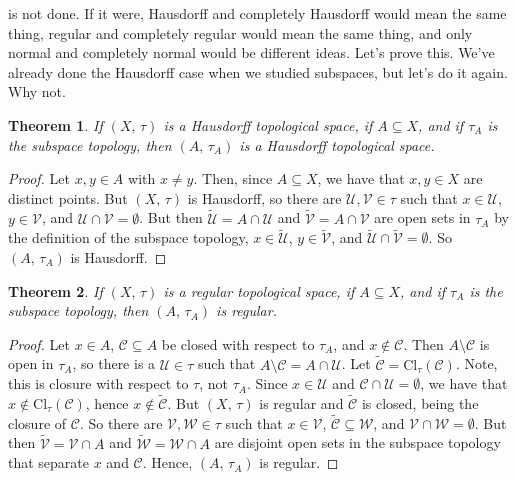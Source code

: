 \documentclass{article}
\theoremstyle{plain}
\newtheorem{theorem}{Theorem}[section]
\theoremstyle{normal}
\begin{document}
        is not done. If it were, Hausdorff and completely Hausdorff would mean
        the same thing, regular and completely regular would mean the same
        thing, and only normal and completely normal would be different ideas.
        Let's prove this. We've already done the Hausdorff case when we studied
        subspaces, but let's do it again. Why not.
        \begin{theorem}
            If $(X,\,\tau)$ is a Hausdorff topological space, if
            $A\subseteq{X}$, and if $\tau_{A}$ is the subspace topology, then
            $(A,\,\tau_{A})$ is a Hausdorff topological space.
        \end{theorem}
        \begin{proof}
            Let $x,y\in{A}$ with $x\ne{y}$. Then, since $A\subseteq{X}$, we
            have that $x,y\in{X}$ are distinct points. But $(X,\,\tau)$ is
            Hausdorff, so there are $\mathcal{U},\mathcal{V}\in\tau$ such that
            $x\in\mathcal{U}$, $y\in\mathcal{V}$, and
            $\mathcal{U}\cap\mathcal{V}=\emptyset$. But then
            $\tilde{\mathcal{U}}=A\cap\mathcal{U}$ and
            $\tilde{\mathcal{V}}=A\cap\mathcal{V}$ are open sets in $\tau_{A}$
            by the definition of the subspace topology,
            $x\in\tilde{\mathcal{U}}$, $y\in\tilde{\mathcal{V}}$, and
            $\tilde{\mathcal{U}}\cap\tilde{\mathcal{V}}=\emptyset$. So
            $(A,\,\tau_{A})$ is Hausdorff.
        \end{proof}
        \begin{theorem}
            If $(X,\,\tau)$ is a regular topological space, if
            $A\subseteq{X}$, and if $\tau_{A}$ is the subspace topology,
            then $(A,\,\tau_{A})$ is regular.
        \end{theorem}
        \begin{proof}
            Let $x\in{A}$, $\mathcal{C}\subseteq{A}$ be closed with respect
            to $\tau_{A}$, and $x\notin\mathcal{C}$. Then
            $A\setminus\mathcal{C}$ is open in $\tau_{A}$, so there is a
            $\mathcal{U}\in\tau$ such that
            $A\setminus\mathcal{C}=A\cap\mathcal{U}$. Let
            $\tilde{\mathcal{C}}=\textrm{Cl}_{\tau}(\mathcal{C})$. Note, this
            is closure with respect to $\tau$, not $\tau_{A}$. Since
            $x\in\mathcal{U}$ and $\mathcal{C}\cap\mathcal{U}=\emptyset$, we
            have that $x\not\in\textrm{Cl}_{\tau}(\mathcal{C})$, hence
            $x\notin\tilde{\mathcal{C}}$. But $(X,\,\tau)$ is regular and
            $\tilde{\mathcal{C}}$ is closed, being the closure of $\mathcal{C}$.
            So there are $\mathcal{V},\mathcal{W}\in\tau$ such that
            $x\in\mathcal{V}$, $\tilde{\mathcal{C}}\subseteq\mathcal{W}$, and
            $\mathcal{V}\cap\mathcal{W}=\emptyset$. But then
            $\tilde{\mathcal{V}}=\mathcal{V}\cap{A}$ and
            $\tilde{\mathcal{W}}=\mathcal{W}\cap{A}$ are disjoint open sets in
            the subspace topology that separate $x$ and $\mathcal{C}$.
            Hence, $(A,\,\tau_{A})$ is regular.
        \end{proof}
\end{document}
